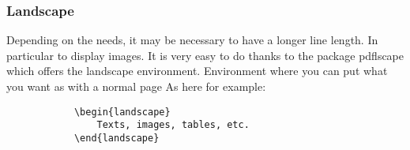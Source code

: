 \begin{landscape}
    \subsubsection{Landscape}
    Depending on the needs, it may be necessary to have a longer line length. In particular to display images.
    It is very easy to do thanks to the package pdflscape which offers the landscape environment. Environment where you can put what you want as with a normal page
    As here for example:
    \begin{code}
        \begin{verbatim}
            \begin{landscape}
                Texts, images, tables, etc.
            \end{landscape}
    \end{verbatim}
        \caption{Use of landscape}
    \end{code}
\end{landscape}